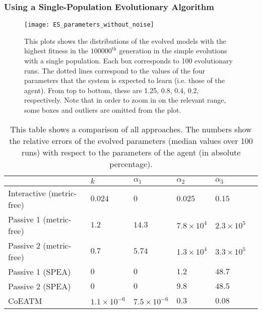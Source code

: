 \subsubsection{Using a Single-Population Evolutionary Algorithm}\label{sec:single_population_EA}
\begin{figure}[!t]
	\centering
	\texttt{[image: ES\_parameters\_without\_noise]}
	\caption{This plots shows the distributions of the evolved models with the highest fitness in the $100000^\textrm{th}$ generation in the simple evolutions with a single population. Each box corresponds to 100 evolutionary runs. The dotted lines correspond to the values of the four parameters that the system is expected to learn (i.e. those of the agent). From top to bottom, these are 1.25, 0.8, 0.4, 0.2, respectively. Note that in order to zoom in on the relevant range, some boxes and outliers are omitted from the plot. \label{fig:evolution}}
\end{figure}

\begin{table}[!t] 
\caption{This table shows a comparison of all approaches. The numbers show the relative errors of the evolved parameters (median values over 100 runs) with respect to the parameters of the agent (in absolute percentage).} 
\renewcommand{\arraystretch}{1.1}
\centering %
\begin{tabular}{l l l l l l} %
\hline\hline  %
 & $k$ & $\alpha_1$ & $\alpha_2$ & $\alpha_3$ &  \\  
\hline   %
Interactive (metric-free) & $0.024$ & $0$ & $0.025$ & $0.15$\\ %
Passive 1 (metric-free) & $1.2$ & $14.3$ & $7.8\times10^4$ & $2.3\times10^5$\\ 
Passive 2 (metric-free) & $0.7$ & $5.74$ & $1.3\times10^4$ & $3.3\times10^5$\\ 
Passive 1 (SPEA) & $0$ & $0$ & $1.2$ & $48.7$ \\ 
Passive 2 (SPEA) & $0$ & $0$ & $9.8$ & $48.5$ \\  %
CoEATM & $1.1\times10^{-6}$ & $7.5\times10^{-6}$ & $0.3$ & $0.08$ \\  %
\hline %
\end{tabular} 
\label{table:relative_accuracy} %
\end{table} 

